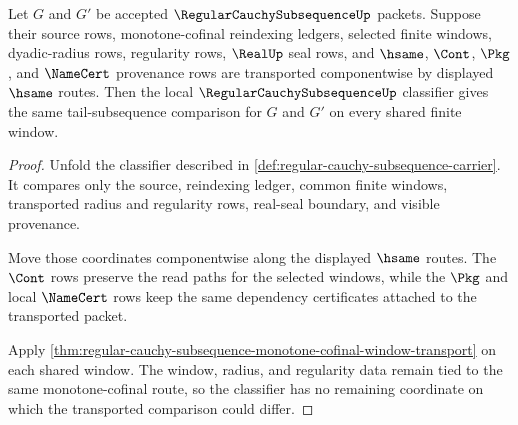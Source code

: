 \begin{theorem}
\label{thm:regular-cauchy-subsequence-tail-classifier-stability}
Let $G$ and $G'$ be accepted $\RegularCauchySubsequenceUp$ packets. Suppose their source rows, monotone-cofinal reindexing ledgers, selected finite windows, dyadic-radius rows, regularity rows, $\RealUp$ seal rows, and $\hsame$, $\Cont$, $\Pkg$, and $\NameCert$ provenance rows are transported componentwise by displayed $\hsame$ routes. Then the local $\RegularCauchySubsequenceUp$ classifier gives the same tail-subsequence comparison for $G$ and $G'$ on every shared finite window.
\end{theorem}
\begin{proof}
Unfold the classifier described in \autoref{def:regular-cauchy-subsequence-carrier}. It compares only the source, reindexing ledger, common finite windows, transported radius and regularity rows, real-seal boundary, and visible provenance.

Move those coordinates componentwise along the displayed $\hsame$ routes. The $\Cont$ rows preserve the read paths for the selected windows, while the $\Pkg$ and local $\NameCert$ rows keep the same dependency certificates attached to the transported packet.

Apply \autoref{thm:regular-cauchy-subsequence-monotone-cofinal-window-transport} on each shared window. The window, radius, and regularity data remain tied to the same monotone-cofinal route, so the classifier has no remaining coordinate on which the transported comparison could differ.
\end{proof}

